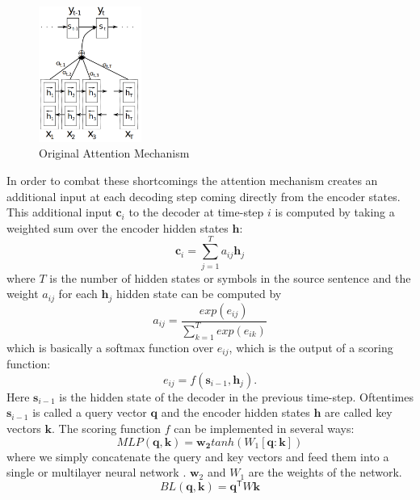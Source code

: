 \documentclass[12pt]{article}
\begin{document}
\begin{figure}[H]
	\label{fig:attentiona}
	\centering
	\includegraphics[width=0.3\textwidth]{pics/bahdanau_attn.png}
	\caption{Original Attention Mechanism \cite{Bahdanau:2014}}
\end{figure}
In order to combat these shortcomings the attention mechanism creates an additional input at each decoding step coming directly from the encoder states. This additional input \(\bm{c}_i\) to the decoder at time-step \(i\) is computed by taking a weighted sum over the encoder hidden states \(\bm{h}\):
\begin{equation} \label{eqattention}
\bm{c}_i=\sum_{j=1}^{T}a_{ij}\bm{h}_j
\end{equation}
where \(T\) is the number of hidden states or symbols in the source sentence and the weight \(a_{ij}\) for each \(\bm{h}_j\) hidden state can be computed by
\begin{equation}
a_{ij}=\frac{exp(e_{ij})}{\sum_{k=1}^{T}exp(e_{ik})}
\end{equation}
which is basically a softmax function over \(e_{ij}\), which is the output of a scoring function:
\begin{equation}
e_{ij}=f(\bm{s}_{i-1},\bm{h}_j).
\end{equation}
Here \(\bm{s}_{i-1}\) is the hidden state of the decoder in the previous time-step. Oftentimes \(\bm{s}_{i-1}\) is called a query vector \(\bm{q}\) and the encoder hidden states \(\bm{h}\) are called key vectors \(\bm{k}\).
The scoring function \(f\) can be implemented in several ways:
\begin{equation}
MLP(\bm{q},\bm{k})=\bm{w_2}tanh(W_1[\bm{q}:\bm{k}])
\end{equation}
where we simply concatenate the query and key vectors and feed them into a single or multilayer neural network \cite{Bahdanau:2014}. \(\bm{w}_2\) and \(W_1\) are the weights of the network.
\begin{equation}
BL(\bm{q},\bm{k})=\bm{q}^\mathsf{T}W\bm{k}
\end{equation}
\end{document}
